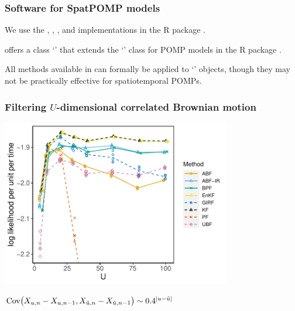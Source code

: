 \documentclass{beamer}
\begin{document}
\begin{frame}
  \frametitle{Software for SpatPOMP models}

  \begin{myitemize}
  \item We use the , , ,  and  implementations in the  R package  \citep{asfaw20github}.

\vspace{5mm}

  \item {} offers a class `' that extends the `' class for POMP models in the R package  \citep{king16}.


\vspace{5mm}

  \item All methods available in  can formally be applied to `' objects, though they may not be practically effective for spatiotemporal POMPs.
    \end{myitemize}
    
\end{frame}

\begin{frame}
\frametitle{Filtering $U$-dimensional correlated Brownian motion}

\vspace{-3mm}

\begin{center}
\includegraphics[width=10cm]{bm_alt_plot-1.pdf}

\vspace{-1mm}

$\mathrm{Cov}\big(X_{u,n}-X_{u,n-1},X_{\tilde u,n}-X_{\tilde u,n-1}\big) \sim 0.4^{|u-\tilde u|}_{}$

\end{center}

\end{frame}
\end{document}
